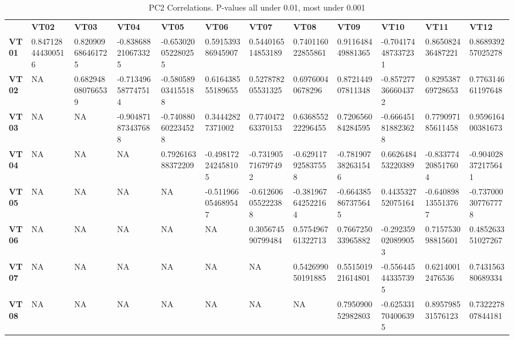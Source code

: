 \documentclass{article}
\begin{document}
\begin{table}[]
\centering
\caption{PC2 Correlations. P-values all under 0.01, most under 0.001}
\label{cor_inter_pc2}
\begin{tabular}{llllllllllll}
              & \textbf{VT02}     & \textbf{VT03}     & \textbf{VT04}      & \textbf{VT05}      & \textbf{VT06}      & \textbf{VT07}      & \textbf{VT08}      & \textbf{VT09}      & \textbf{VT10}      & \textbf{VT11}      & \textbf{VT12}      \\
\textbf{VT01} & 0.847128444300516 & 0.820909686461725 & -0.838688210673325 & -0.653020052280255 & 0.591539386945907  & 0.544016514853189  & 0.740116022855861  & 0.911648449881365  & -0.704174487337231 & 0.865082436487221  & 0.868939257025278  \\
\textbf{VT02} & NA                & 0.682948080766539 & -0.713496587747514 & -0.580589034155188 & 0.616438555189655  & 0.527878205531325  & 0.69760040678296   & 0.872144907811348  & -0.857277366604372 & 0.829538769728653  & 0.776314661197648  \\
\textbf{VT03} & NA                & NA                & -0.904871873437688 & -0.740880602234528 & 0.34442827371002   & 0.774047263370153  & 0.636855222296455  & 0.720656084284595  & -0.666451818823628 & 0.779097185611458  & 0.959616400381673  \\
\textbf{VT04} & NA                & NA                & NA                 & 0.792616388372209  & -0.498172242458105 & -0.731905716797492 & -0.629117925837558 & -0.781907382631546 & 0.662648453220389  & -0.833774208517604 & -0.904028372175641 \\
\textbf{VT05} & NA                & NA                & NA                 & NA                 & -0.511966054689547 & -0.612606055222388 & -0.381967642522164 & -0.664385867375645 & 0.443532752075164  & -0.640898135513767 & -0.737000307767778 \\
\textbf{VT06} & NA                & NA                & NA                 & NA                 & NA                 & 0.305674590799484  & 0.575496761322713  & 0.766725033965882  & -0.292359020899053 & 0.715753098815601  & 0.485263351027267  \\
\textbf{VT07} & NA                & NA                & NA                 & NA                 & NA                 & NA                 & 0.542699050191885  & 0.551501921614801  & -0.556445443357395 & 0.62140012476536   & 0.743156380689334  \\
\textbf{VT08} & NA                & NA                & NA                 & NA                 & NA                 & NA                 & NA                 & 0.795090052982803  & -0.625331704006395 & 0.895798531576123  & 0.732227807844181  \\

\end{tabular}
\end{table}
\end{document}
